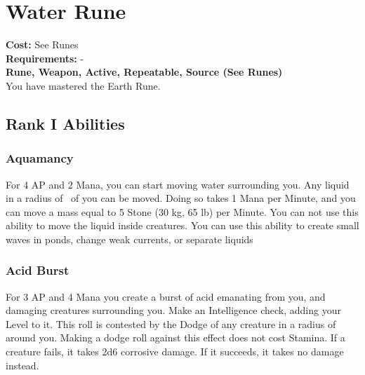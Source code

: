 \section{Water Rune}\label{rune:water}
\textbf{Cost:} See Runes\\
\textbf{Requirements:} -\\
\textbf{Rune, Weapon, Active, Repeatable, Source (See Runes)}\\
You have mastered the Earth Rune.

\subsection{Rank I Abilities}

\subsubsection{Aquamancy}
For 4 AP and 2 Mana, you can start moving water surrounding you.
Any liquid in a radius of~ of you can be moved.
Doing so takes 1 Mana per Minute, and you can move a mass equal to 5 Stone (30 kg, 65 lb) per Minute.
You can not use this ability to move the liquid inside creatures.
You can use this ability to create small waves in ponds, change weak currents, or separate liquids

\subsubsection{Acid Burst}
For 3 AP and 4 Mana you create a burst of acid emanating from you, and damaging creatures surrounding you.
Make an Intelligence check, adding your Level to it.
This roll is contested by the Dodge of any creature in a radius of~ around you.
Making a dodge roll against this effect does not cost Stamina.
If a creature fails, it takes 2d6 corrosive damage.
If it succeeds, it takes no damage instead.
